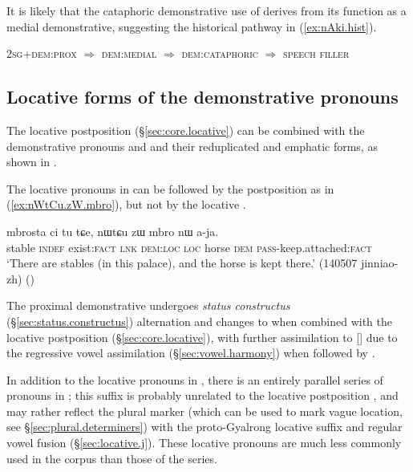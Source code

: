 It is likely that the cataphoric demonstrative use of  derives  from its function as a medial demonstrative, suggesting the historical pathway in (\ref{ex:nAki.hist}).

\begin{exe}
\ex \label{ex:nAki.hist}
\glt \textsc{2sg}+\textsc{dem}:\textsc{prox} $\Rightarrow$ \textsc{dem}:\textsc{medial} $\Rightarrow$ \textsc{dem}:\textsc{cataphoric} $\Rightarrow$ \textsc{speech filler}
\end{exe}

\subsection{Locative forms of the demonstrative pronouns} \label{sec:locative.pronoun}
The locative postposition  (§\ref{sec:core.locative}) can be combined with the demonstrative pronouns  and  and their reduplicated and emphatic forms, as shown in .  

The locative pronouns in  can be followed by the postposition  as in (\ref{ex:nWtCu.zW.mbro}), but not by the locative .
 
\begin{exe}
\ex \label{ex:nWtCu.zW.mbro}
 \gll mbrosta ci tu tɕe, nɯtɕu zɯ mbro nɯ a-ja. \\
 stable \textsc{indef} exist:\textsc{fact} \textsc{lnk} \textsc{dem}:\textsc{loc} \textsc{loc} horse \textsc{dem} \textsc{pass}-keep.attached:\textsc{fact} \\
 \glt `There are stables (in this palace), and the horse is kept there.' (140507 jinniao-zh) ()
\end{exe} 

The proximal demonstrative  undergoes \textit{status constructus} (§\ref{sec:status.constructus}) alternation and changes to  when combined with the locative postposition  (§\ref{sec:core.locative}), with further assimilation to [] due to the regressive vowel assimilation (§\ref{sec:vowel.harmony}) when followed by  .

 In addition to the locative pronouns in  , there is an entirely parallel series of pronouns in ; this suffix is probably unrelated to the locative postposition , and may rather reflect the plural marker  (which can be used to mark vague location, see §\ref{sec:plural.determiners}) with the proto-Gyalrong locative suffix  and regular vowel fusion (§\ref{sec:locative.j}). These locative pronouns are much less commonly used in the corpus than those of the   series.
 

